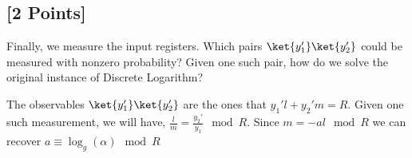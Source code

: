 \documentclass[11pt]{article}
\begin{document}
\subsection{[2 Points]} Finally, we measure the input registers. Which pairs $\ket{y_1'}\ket{y_2'}$ could be measured with nonzero probability? Given one such pair, how do we solve the original instance of Discrete Logarithm?

\begin{solution}
    The observables $\ket{y_1'}\ket{y_2'}$ are the ones that $y_1'l + y_2'm = R$. Given one such measurement, we will have, $\frac{l}{m} = \frac{y_2'}{y_1} \mod R$. Since $m = -al \mod R$ we can recover $a \equiv \log_g(\alpha) \mod R$  
\end{solution}
\end{document}
